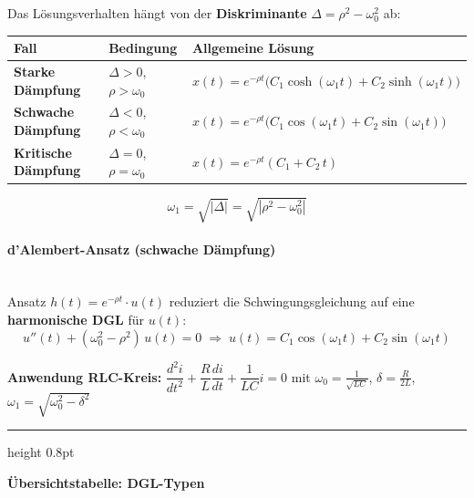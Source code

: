 \documentclass[../../zusammenfassung_AN.tex]{subfiles}
\begin{document}
	Das Lösungsverhalten hängt von der \textbf{Diskriminante} $\Delta = \rho^2 - \omega_0^2$ ab:
	
	\vspace{0.5em}
	\renewcommand{\arraystretch}{1.6}
	\begin{tabular}{>{\bfseries}p{3.8cm} p{3.8cm} p{7cm}}
		\toprule
		\textbf{Fall} & \textbf{Bedingung} & \textbf{Allgemeine Lösung} \\
		\midrule
		Starke Dämpfung
		& $\Delta>0$, $\rho>\omega_0$
		& $x(t)=e^{-\rho t}\!\bigl(C_1\cosh(\omega_1 t)+C_2\sinh(\omega_1 t)\bigr)$ \\
		Schwache Dämpfung
		& $\Delta<0$, $\rho<\omega_0$
		& $x(t)=e^{-\rho t}\!\bigl(C_1\cos(\omega_1 t)+C_2\sin(\omega_1 t)\bigr)$ \\
		Kritische Dämpfung
		& $\Delta=0$, $\rho=\omega_0$
		& $x(t)=e^{-\rho t}(C_1+C_2\,t)$ \\
		\bottomrule
	\end{tabular}
	
	\[
	\omega_1 = \sqrt{|\Delta|} = \sqrt{|\rho^2-\omega_0^2|}
	\]
	
	\paragraph*{d'Alembert-Ansatz (schwache Dämpfung)}\mbox{}\\
	Ansatz $h(t)=e^{-\rho t}\cdot u(t)$ reduziert die Schwingungsgleichung auf eine
	\textbf{harmonische DGL} für $u(t)$:
	\[
	u''(t)+(\omega_0^2-\rho^2)\,u(t)=0
	\;\Rightarrow\;
	u(t)=C_1\cos(\omega_1 t)+C_2\sin(\omega_1 t)
	\]
	
	\begin{tcolorbox}[hinweis]
		\textbf{Anwendung RLC-Kreis:}\;
		$\dfrac{d^2i}{dt^2}+\dfrac{R}{L}\dfrac{di}{dt}+\dfrac{1}{LC}i=0$
		\;mit\; $\omega_0=\tfrac{1}{\sqrt{LC}}$,\; $\delta=\tfrac{R}{2L}$,\; $\omega_1=\sqrt{\omega_0^2-\delta^2}$
	\end{tcolorbox}
	
	\vspace{0.8em}
	\hrule height 0.8pt
	\vspace{0.5em}
	\begin{center}
		{\large\textbf{\color{mainblue}Übersichtstabelle: DGL-Typen}}
	\end{center}
	
\end{document}
